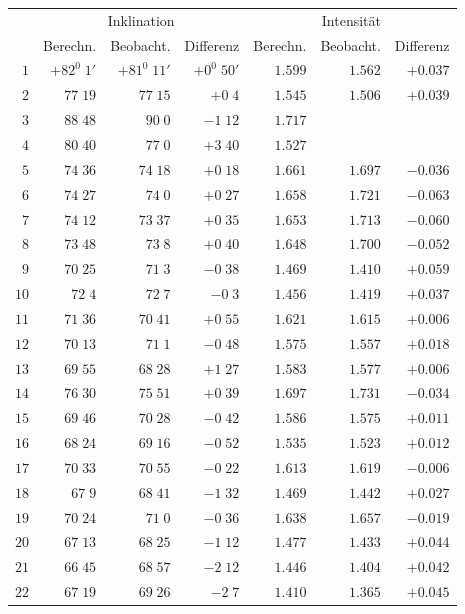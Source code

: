 \clearpage
{}
\begingroup
\fontsize{9}{10.2}\selectfont
\setlength{\tabcolsep}{2.5pt}
\renewcommand{\arraystretch}{1.02}
\begin{center}
\begin{tabular}{r||r|r|r||r|r|r}
\hline
&\multicolumn{3}{c||}{Inklination}&\multicolumn{3}{c}{Intensität}\\
&Berechn.&Beobacht.&Differenz&Berechn.&Beobacht.&Differenz\\\hline
$1$&$+82^0\;1'$&$+81^0\;11'$&$+0^0\;50'$&$1.599$&$1.562$&$+0.037$\\
$2$&$77\;19$&$77\;15$&$+0\;4$&$1.545$&$1.506$&$+0.039$\\
$3$&$88\;48$&$90\;0$&$-1\;12$&$1.717$&&\\
$4$&$80\;40$&$77\;0$&$+3\;40$&$1.527$&&\\
$5$&$74\;36$&$74\;18$&$+0\;18$&$1.661$&$1.697$&$-0.036$\\
$6$&$74\;27$&$74\;0$&$+0\;27$&$1.658$&$1.721$&$-0.063$\\
$7$&$74\;12$&$73\;37$&$+0\;35$&$1.653$&$1.713$&$-0.060$\\
$8$&$73\;48$&$73\;8$&$+0\;40$&$1.648$&$1.700$&$-0.052$\\
$9$&$70\;25$&$71\;3$&$-0\;38$&$1.469$&$1.410$&$+0.059$\\
$10$&$72\;4$&$72\;7$&$-0\;3$&$1.456$&$1.419$&$+0.037$\\[2pt]
$11$&$71\;36$&$70\;41$&$+0\;55$&$1.621$&$1.615$&$+0.006$\\
$12$&$70\;13$&$71\;1$&$-0\;48$&$1.575$&$1.557$&$+0.018$\\
$13$&$69\;55$&$68\;28$&$+1\;27$&$1.583$&$1.577$&$+0.006$\\
$14$&$76\;30$&$75\;51$&$+0\;39$&$1.697$&$1.731$&$-0.034$\\
$15$&$69\;46$&$70\;28$&$-0\;42$&$1.586$&$1.575$&$+0.011$\\
$16$&$68\;24$&$69\;16$&$-0\;52$&$1.535$&$1.523$&$+0.012$\\
$17$&$70\;33$&$70\;55$&$-0\;22$&$1.613$&$1.619$&$-0.006$\\
$18$&$67\;9$&$68\;41$&$-1\;32$&$1.469$&$1.442$&$+0.027$\\
$19$&$70\;24$&$71\;0$&$-0\;36$&$1.638$&$1.657$&$-0.019$\\
$20$&$67\;13$&$68\;25$&$-1\;12$&$1.477$&$1.433$&$+0.044$\\[2pt]
$21$&$66\;45$&$68\;57$&$-2\;12$&$1.446$&$1.404$&$+0.042$\\
$22$&$67\;19$&$69\;26$&$-2\;7$&$1.410$&$1.365$&$+0.045$\\

\end{tabular}
\end{center}
